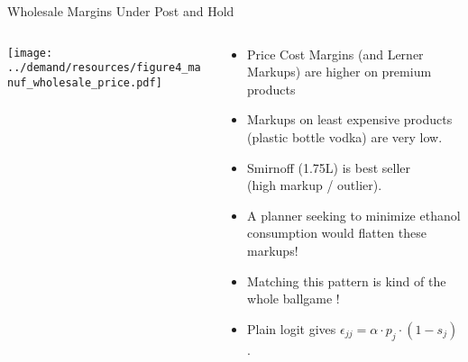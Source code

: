 \begin{frame}{Wholesale Margins Under Post and Hold}
\begin{columns}[T]
\begin{column}{.5\textwidth}
\begin{center}
\texttt{[image: ../demand/resources/figure4\_manuf\_wholesale\_price.pdf]}
\end{center}
\end{column}
\hfill
\begin{column}{.5\textwidth}
  \begin{itemize}
  \item Price Cost Margins (and Lerner Markups) are higher on premium products
  \item Markups on least expensive products (plastic bottle vodka) are very low.
  \item Smirnoff (1.75L) is best seller\\ (high markup / outlier).
  \item A planner seeking to minimize ethanol consumption would flatten these markups!
  \item Matching this pattern is kind of the whole ballgame !
  \item Plain logit gives $\epsilon_{jj} = \alpha \cdot p_j  \cdot (1-s_j)$.
  \end{itemize}
  \end{column}
\end{columns}
\end{frame}



